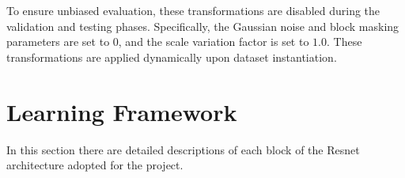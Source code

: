 To ensure unbiased evaluation, these transformations are disabled during the validation and testing phases. Specifically, the Gaussian noise and block masking parameters are set to $0$, and the scale variation factor is set to $1.0$. These transformations are applied dynamically upon dataset instantiation.



\section{Learning Framework}
\label{sec:learning_framework}

In this section there are detailed descriptions of each block of the Resnet architecture adopted for the project.



